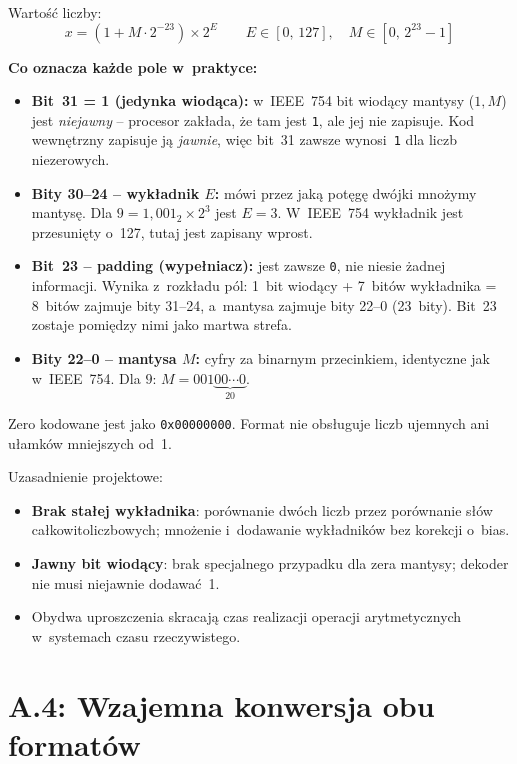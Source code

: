 \documentclass[12pt,a4paper]{article}
\begin{document}
Wartość liczby:
\[
  x = (1 + M \cdot 2^{-23}) \times 2^E
  \qquad E \in [0,\,127],\quad M \in [0,\,2^{23}-1]
\]

\medskip
\noindent\textbf{Co oznacza każde pole w~praktyce:}
\begin{itemize}
  \item \textbf{Bit~31 = 1 (jedynka wiodąca):} w~IEEE~754 bit wiodący mantysy
        ($1{,}M$) jest \emph{niejawny} -- procesor zakłada, że tam jest \texttt{1},
        ale jej nie zapisuje. Kod wewnętrzny zapisuje ją \emph{jawnie},
        więc bit~31 zawsze wynosi~\texttt{1} dla liczb niezerowych.
  \item \textbf{Bity 30--24 -- wykładnik $E$:} mówi przez jaką potęgę dwójki
        mnożymy mantysę. Dla $9 = 1{,}001_2 \times 2^3$ jest $E = 3$.
        W~IEEE~754 wykładnik jest przesunięty o~127, tutaj jest zapisany wprost.
  \item \textbf{Bit~23 -- padding (wypełniacz):} jest zawsze \texttt{0},
        nie niesie żadnej informacji. Wynika z~rozkładu pól: 1~bit wiodący
        + 7~bitów wykładnika = 8~bitów zajmuje bity 31--24,
        a~mantysa zajmuje bity 22--0 (23~bity).
        Bit~23 zostaje pomiędzy nimi jako martwa strefa.
  \item \textbf{Bity 22--0 -- mantysa $M$:} cyfry za binarnym przecinkiem,
        identyczne jak w~IEEE~754. Dla $9$: $M = 001\underbrace{00\cdots0}_{20}$.
\end{itemize}

Zero kodowane jest jako \texttt{0x00000000}.
Format nie obsługuje liczb ujemnych ani ułamków mniejszych od~1.

Uzasadnienie projektowe:
\begin{itemize}
  \item \textbf{Brak stałej wykładnika}: porównanie dwóch liczb przez
        porównanie słów całkowitoliczbowych; mnożenie i~dodawanie wykładników
        bez korekcji o~bias.
  \item \textbf{Jawny bit wiodący}: brak specjalnego przypadku dla zera
        mantysy; dekoder nie musi niejawnie dodawać~1.
  \item Obydwa uproszczenia skracają czas realizacji operacji arytmetycznych
        w~systemach czasu rzeczywistego.
\end{itemize}

\section*{A.4: Wzajemna konwersja obu formatów}
\end{document}

